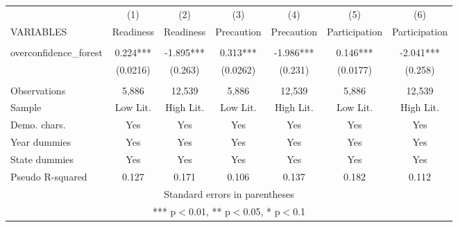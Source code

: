 \documentclass[]{article}
\begin{document}
\begin{tabular}{lcccccc} \hline
 & (1) & (2) & (3) & (4) & (5) & (6) \\
VARIABLES & Readiness & Readiness & Precaution & Precaution & Participation & Participation \\ \hline
 &  &  &  &  &  &  \\
overconfidence\_forest & 0.224*** & -1.895*** & 0.313*** & -1.986*** & 0.146*** & -2.041*** \\
 & (0.0216) & (0.263) & (0.0262) & (0.231) & (0.0177) & (0.258) \\
 &  &  &  &  &  &  \\
Observations & 5,886 & 12,539 & 5,886 & 12,539 & 5,886 & 12,539 \\
Sample & Low Lit. & High Lit. & Low Lit. & High Lit. & Low Lit. & High Lit. \\
Demo. chars. & Yes & Yes & Yes & Yes & Yes & Yes \\
Year dummies & Yes & Yes & Yes & Yes & Yes & Yes \\
State dummies & Yes & Yes & Yes & Yes & Yes & Yes \\
 Pseudo R-squared & 0.127 & 0.171 & 0.106 & 0.137 & 0.182 & 0.112 \\ \hline
\multicolumn{7}{c}{ Standard errors in parentheses} \\
\multicolumn{7}{c}{ *** p$<$0.01, ** p$<$0.05, * p$<$0.1} \\
\end{tabular}
\end{document}
